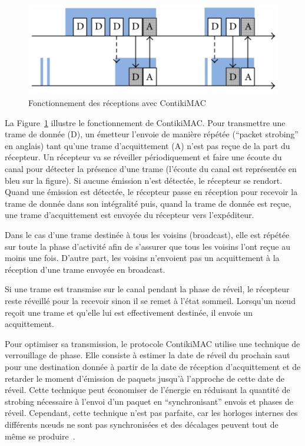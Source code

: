 \begin{figure}[ht]
  \centering
  \includegraphics[width=.5\textwidth]{img/contikimac.png}
  \caption{Fonctionnement des réceptions avec ContikiMAC}
  \label{supervision:fig:contikimac}
\end{figure}

La Figure~\ref{supervision:fig:contikimac} illustre le fonctionnement de ContikiMAC.
Pour transmettre une trame de donnée (D), un émetteur l'envoie de manière répétée (``packet strobing'' en anglais) tant qu'une trame d'acquittement (A) n'est pas reçue de la part du récepteur.
Un récepteur va se réveiller périodiquement et faire une écoute du canal pour détecter la présence d'une trame (l'écoute du canal est représentée en bleu sur la figure).
Si aucune émission n'est détectée, le récepteur se rendort.
Quand une émission est détectée, le récepteur passe en réception pour recevoir la trame de donnée dans son intégralité puis, quand la trame de donnée est reçue, une trame d'acquittement est envoyée du récepteur vers l'expéditeur.

Dans le cas d'une trame destinée à tous les voisins (broadcast), elle est répétée sur toute la phase d'activité afin de s’assurer que tous les voisins l’ont reçue au moins une fois.
D'autre part, les voisins n'envoient pas un acquittement à la réception d'une trame envoyée en broadcast.

Si une trame est transmise sur le canal pendant la phase de réveil, le récepteur reste réveillé pour la recevoir sinon il se remet à l’état sommeil.
Lorsqu'un nœud reçoit une trame et qu'elle lui est effectivement destinée, il envoie un acquittement.

Pour optimiser sa transmission, le protocole ContikiMAC utilise une technique de verrouillage de phase.
Elle consiste à estimer la date de réveil du prochain saut pour une destination donnée à partir de la date de réception d’acquittement et de retarder le moment d’émission de paquets jusqu’à l’approche de cette date de réveil.
Cette technique peut économiser de l'énergie en réduisant la quantité de strobing nécessaire à l'envoi d'un paquet en ``synchronisant'' envois et phases de réveil.
Cependant, cette technique n'est pas parfaite, car les horloges internes des différents nœuds ne sont pas synchronisées et des décalages peuvent tout de même se produire~\cite{gonizzi2014rawmac}.

